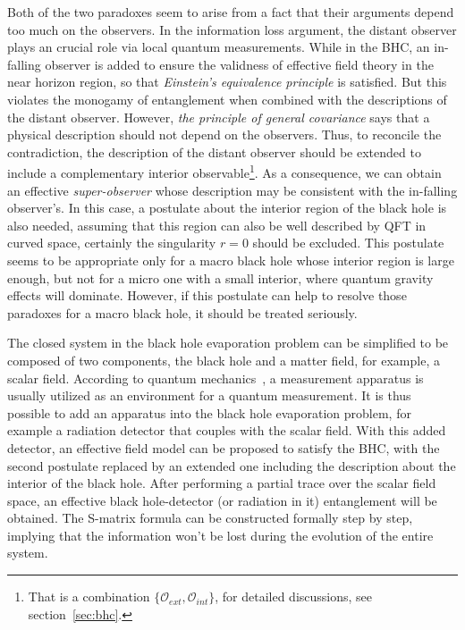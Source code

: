 \documentclass[12pt,a4paper]{article}
\begin{document}
Both of the two paradoxes seem to arise from a fact that their arguments depend too much on the observers. In the information loss argument, the distant observer plays an crucial role via local quantum measurements. While in the BHC, an in-falling observer is added to ensure the validness of effective field theory in the near horizon region, so that \emph{Einstein's equivalence principle} is satisfied. But this violates the monogamy of entanglement when combined with the descriptions of the distant observer. However, \emph{the principle of general covariance} says that a physical description should not depend on the observers. Thus, to reconcile the contradiction, the description of the distant observer should be extended to include a complementary interior observable\footnote{That is a combination $\{\mathcal{O}_{ext},\mathcal{O}_{int}\}$, for detailed discussions, see section~\ref{sec:bhc}.}. As a consequence, we can obtain an effective \emph{super-observer} whose description may be consistent with the in-falling observer's. In this case, a postulate about the interior region of the black hole is also needed, assuming that this region can also be well described by QFT in curved space, certainly the singularity $r=0$ should be excluded. This postulate seems to be appropriate only for a macro black hole whose interior region is large enough, but not for a micro one with a small interior, where quantum gravity effects will dominate. However, if this postulate can help to resolve those paradoxes for a macro black hole, it should be treated seriously.

The closed system in the black hole evaporation problem can be simplified to be
composed of two components, the black hole and a matter
field, for example, a scalar field. According to quantum mechanics~\cite{i}, a measurement apparatus is usually utilized as an
environment for a quantum measurement. It is thus possible to add an apparatus into the black hole evaporation problem, for example a radiation
detector that couples with the scalar field. With this added detector, an
effective field model can be proposed to satisfy the BHC, with the second postulate replaced by an extended one including the description about the interior of the black hole. After performing a partial trace over the scalar field space, an effective
black hole-detector (or radiation in it) entanglement will be obtained. The S-matrix formula can be
constructed formally step by step, implying that the information won't be lost during the
evolution of the entire system.
\end{document}
